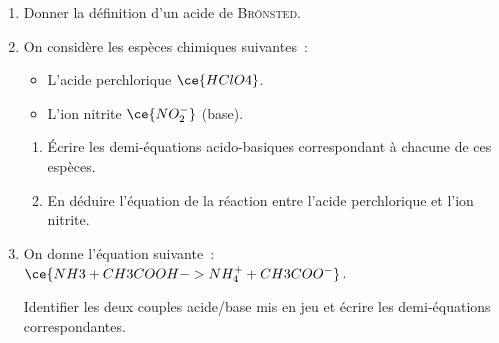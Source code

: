 \begin{enumerate}
    \item Donner la définition d'un acide de \textsc{Brönsted}.
    \item On considère les espèces chimiques suivantes~:
          \begin{itemize}
              \item L'acide perchlorique $\ce{HClO4}$. 
              \item L'ion nitrite $\ce{NO_2^-}$ (base). 
          \end{itemize}
          \begin{enumerate}
              \item Écrire les demi-équations acido-basiques correspondant à
                    chacune de ces espèces.
              \item En déduire l'équation de la réaction entre l'acide
                    perchlorique et l'ion nitrite.
          \end{enumerate}
    \item On donne l'équation suivante~:
          $\ce{NH3 + CH3COOH -> NH_4^+ + CH3COO^-}$.

          Identifier les deux couples acide/base mis en jeu et écrire les
          demi-équations correspondantes.
\end{enumerate}

